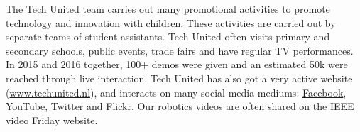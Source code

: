 The Tech United team carries out many promotional activities to promote technology and innovation with children. These activities are carried out by separate teams of student assistants. Tech United often visits primary and secondary schools, public events, trade fairs and have regular TV performances. In 2015 and 2016 together, 100+ demos were given and an estimated 50k were reached through live interaction.
Tech United has also got a very active website (\url{www.techunited.nl}), and interacts on many social media mediums: \href{https://www.facebook.com/techunited}{Facebook}, \href{https://www.youtube.com/user/TechUnited}{YouTube}, \href{https://twitter.com/TechUnited}{Twitter} and \href{https://www.flickr.com/photos/techunited/}{Flickr}. Our robotics videos are often shared on the IEEE video Friday website.
